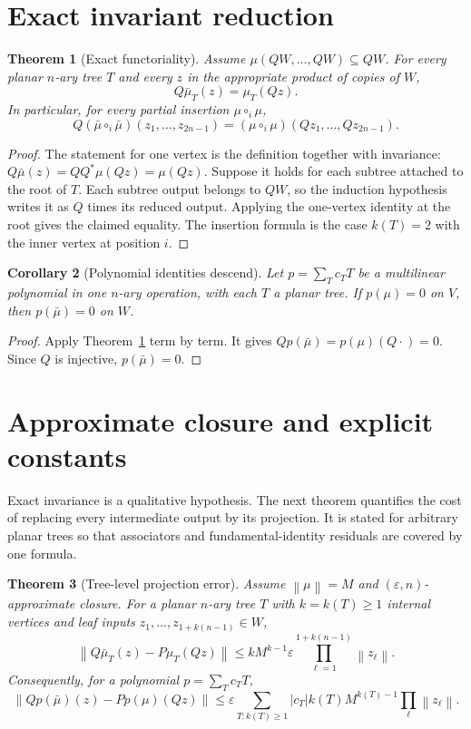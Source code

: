 \documentclass[11pt]{article}
\newtheorem{theorem}{Theorem}[section]
\newtheorem{corollary}[theorem]{Corollary}
\newcommand{\norm}[1]{\left\lVert #1\right\rVert}
\begin{document}
\section{Exact invariant reduction}

\begin{theorem}[Exact functoriality]
\label{thm:exact}
Assume $\mu(QW,\ldots,QW)\subseteq QW$. For every planar $n$-ary tree $T$ and every $z$ in the appropriate product of copies of $W$,
\[
    Q\bar\mu_T(z)=\mu_T(Qz).
\]
In particular, for every partial insertion $\mu\circ_i\mu$,
\[
    Q(\bar\mu\circ_i\bar\mu)(z_1,\ldots,z_{2n-1})
    =(\mu\circ_i\mu)(Qz_1,\ldots,Qz_{2n-1}).
\]
\end{theorem}

\begin{proof}
The statement for one vertex is the definition together with invariance:
\(Q\bar\mu(z)=QQ^*\mu(Qz)=\mu(Qz)\). Suppose it holds for each subtree attached to the root of $T$. Each subtree output belongs to $QW$, so the induction hypothesis writes it as $Q$ times its reduced output. Applying the one-vertex identity at the root gives the claimed equality. The insertion formula is the case $k(T)=2$ with the inner vertex at position $i$.
\end{proof}

\begin{corollary}[Polynomial identities descend]
\label{cor:polynomial}
Let $p=\sum_T c_T T$ be a multilinear polynomial in one $n$-ary operation, with each $T$ a planar tree. If $p(\mu)=0$ on $V$, then $p(\bar\mu)=0$ on $W$.
\end{corollary}

\begin{proof}
Apply Theorem~\ref{thm:exact} term by term. It gives $Qp(\bar\mu)=p(\mu)(Q\cdot)=0$. Since $Q$ is injective, $p(\bar\mu)=0$.
\end{proof}

\section{Approximate closure and explicit constants}

Exact invariance is a qualitative hypothesis. The next theorem quantifies the cost of replacing every intermediate output by its projection. It is stated for arbitrary planar trees so that associators and fundamental-identity residuals are covered by one formula.

\begin{theorem}[Tree-level projection error]
\label{thm:closure}
Assume $\norm{\mu}=M$ and $(\varepsilon,n)$-approximate closure. For a planar $n$-ary tree $T$ with $k=k(T)\geq 1$ internal vertices and leaf inputs $z_1,\ldots,z_{1+k(n-1)}\in W$,
\[
 \norm{Q\bar\mu_T(z)-P\mu_T(Qz)}
 \leq kM^{k-1}\varepsilon\prod_{\ell=1}^{1+k(n-1)}\norm{z_\ell}.
\]
Consequently, for a polynomial $p=\sum_T c_TT$,
\[
 \norm{Qp(\bar\mu)(z)-Pp(\mu)(Qz)}
 \leq \varepsilon\sum_{T:k(T)\geq1}|c_T|k(T)M^{k(T)-1}\prod_\ell\norm{z_\ell}.
\]
\end{theorem}
\end{document}
